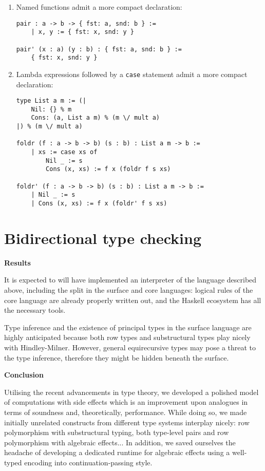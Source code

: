 \documentclass[a4paper,14pt]{extreport}
\begin{document}
\begin{enumerate}
    \item Named functions admit a more compact declaration:
\begin{verbatim}
pair : a -> b -> { fst: a, snd: b } :=
    | x, y := { fst: x, snd: y }

pair' (x : a) (y : b) : { fst: a, snd: b } :=
    { fst: x, snd: y }
\end{verbatim}
    \item Lambda expressions followed by a \verb|case| statement admit a more
        compact declaration:
\begin{verbatim}
type List a m := (|
    Nil: {} % m
    Cons: (a, List a m) % (m \/ mult a)
|) % (m \/ mult a)

foldr (f : a -> b -> b) (s : b) : List a m -> b :=
    | xs := case xs of
        Nil _ := s
        Cons (x, xs) := f x (foldr f s xs)

foldr' (f : a -> b -> b) (s : b) : List a m -> b :=
    | Nil _ := s
    | Cons (x, xs) := f x (foldr' f s xs)
\end{verbatim}
\end{enumerate}

\section{Bidirectional type checking}

\textbf{Results}

It is expected to will have implemented an interpreter of the language described
above, including the split in the surface and core languages: logical rules of
the core language are already properly written out, and the Haskell ecosystem
has all the necessary tools.

Type inference and the existence of principal types in the surface language are
highly anticipated because both row types and substructural types play nicely
with Hindley-Milner. However, general equirecursive types may pose a threat to
the type inference, therefore they might be hidden beneath the surface.

\textbf{Conclusion}

Utilising the recent advancements in type theory, we developed a polished model
of computations with side effects which is an improvement upon analogues in
terms of soundness and, theoretically, performance. While doing so, we made
initially unrelated constructs from different type systems interplay nicely: row
polymorphism with substructural typing, both type-level pairs and row
polymorphism with algebraic effects... In addition, we saved ourselves the
headache of developing a dedicated runtime for algebraic effects using a
well-typed encoding into continuation-passing style.
\end{document}
